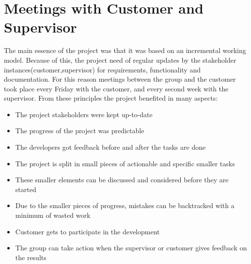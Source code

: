 \section{Meetings with Customer and Supervisor}
The main essence of the project was that it was based on an incremental working model. Because of this, the project need of regular updates by the stakeholder instances(customer,supervisor) for requirements, functionality and documentation. For this reason meetings between the group and the customer took place every Friday with the customer, and every second week with the supervisor.   
From these principles the project benefited in many aspects:
\begin{itemize}
\item The project stakeholders were kept up-to-date
\item The progress of the project was predictable
\item The developers got feedback before and after the tasks are done
\item The project is split in small pieces of actionable and specific smaller tasks
\item These smaller elements can be discussed and considered before they are started
\item Due to the smaller pieces of progress, mistakes can be backtracked with a minimum of wasted work
\item Customer gets to participate in the development
\item The group can take action when the supervisor or customer gives feedback on the results
\end{itemize}

